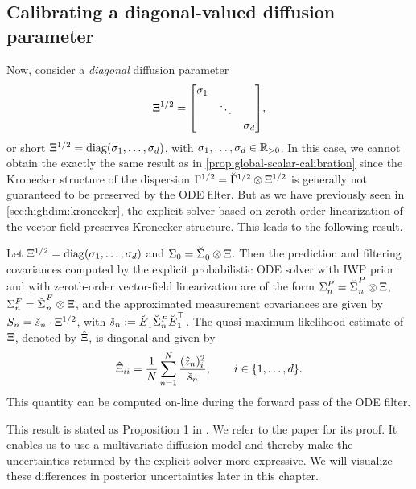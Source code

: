 \documentclass{mimosis}
\begin{document}
\subsection{Calibrating a diagonal-valued diffusion parameter}
\label{sec:org5089c06}
Now, consider a \emph{diagonal} diffusion parameter
\begin{equation}
\Diff = \mqty[\dmat{\sdiff_1, \ddots, \sdiff_d}],
\end{equation}
or short
\(\Diff = \diag(\sdiff_1, \dots, \sdiff_d)\),
with \(\sigma_1, \dots, \sigma_d \in \mathbb{R}_{>0}\).
In this case, we cannot obtain the exactly the same result as in
\cref{prop:global-scalar-calibration}
since the Kronecker structure of the dispersion \(\Gamma^{1/2} = \breve{\Gamma}^{1/2} \otimes \Xi^{1/2}\) is generally not guaranteed to be preserved by the ODE filter.
But as we have previously seen in \cref{sec:highdim:kronecker},
the explicit solver based on zeroth-order linearization of the vector field preserves Kronecker structure.
This leads to the following result.

\begin{proposition}
Let
\(\Diff=\diag(\sdiff_1, \dots, \sdiff_d)\)
and
\(\Sigma_{0} = \breve{\Sigma_{}}_0 \otimes \Xi\).
Then the prediction and filtering covariances computed by the explicit probabilistic ODE solver with IWP prior and with zeroth-order vector-field linearization
are of the form
\(\Sigma_{n}^P = \breve{\Sigma_{}}_n^P \otimes \Xi\),
\(\Sigma_{n}^F = \breve{\Sigma_{}}_n^F \otimes \Xi\),
and the approximated measurement covariances are given by
\(S_n = \breve{s}_n \cdot \Xi^{1/2}\), with
\(\breve{s}_n := \breve{E_{}}_1 \breve{\Sigma}_n^P \breve{E_{}}_1^\top\).
The quasi maximum-likelihood estimate of \(\Xi\), denoted by \(\hat{\Xi}\), is diagonal and given by
\begin{equation}
  \hat{\Xi}_{ii} = \frac{1}{N} \sum_{n=1}^N \frac{(\hat{z}_n)_i^2}{\breve{s}_n}, \qquad i \in \{1, \dots, d\}.
\end{equation}
This quantity can be computed on-line during the forward pass of the ODE filter.
\label{prop:fixedMV}
\end{proposition}

This result is stated as Proposition 1 in \capos{}.
We refer to the paper for its proof.
It enables us to use a multivariate diffusion model and thereby make the uncertainties returned by the explicit solver more expressive.
We will visualize these differences in posterior uncertainties later in this chapter.
\end{document}
